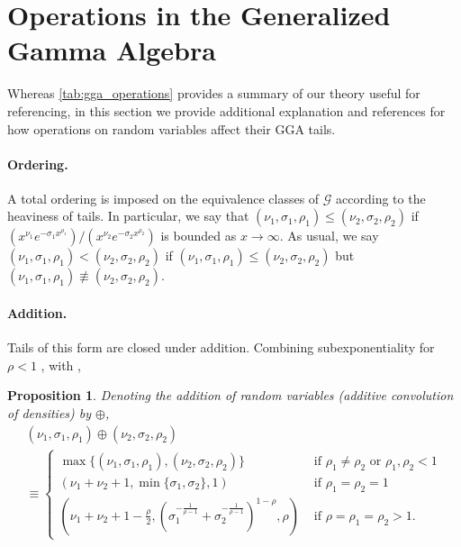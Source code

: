 \documentclass{article}
\newtheorem{proposition}{Proposition}
\theoremstyle{definition}
\begin{document}
\section{Operations in the Generalized Gamma Algebra}

Whereas \cref{tab:gga_operations} provides a summary of our theory useful
for referencing, in this section we provide additional explanation and references
for how operations on random variables affect their GGA tails.

\paragraph{Ordering.} A total ordering is imposed on the equivalence classes of $\mathcal{G}$ according to the heaviness of tails. In particular, we say that $(\nu_1,\sigma_1,\rho_1) \leq (\nu_2,\sigma_2,\rho_2)$ if $(x^{\nu_1} e^{-\sigma_1 x^{\rho_1}}) / (x^{\nu_2} e^{-\sigma_2 x^{\rho_2}})$ is bounded as $x \to \infty$. As usual, we say $(\nu_1,\sigma_1,\rho_1) < (\nu_2,\sigma_2,\rho_2)$ if $(\nu_1,\sigma_1,\rho_1) \leq (\nu_2,\sigma_2,\rho_2)$ but $(\nu_1,\sigma_1,\rho_1) \not\equiv (\nu_2,\sigma_2,\rho_2)$. 


\paragraph{Addition.} Tails of this form are  closed under addition. Combining subexponentiality for $\rho < 1$
\cite[Chapter X.1]{asmussen2010ruin}, 
with \cite[Thm 3.1 \& eqn. (8.3)]{asmussen2017tail},
\begin{proposition}
\label{prop:gga_add}
Denoting the addition of random variables (additive convolution of densities) by $\oplus$,
\begin{multline}
(\nu_{1},\sigma_{1},\rho_{1})\oplus(\nu_{2},\sigma_{2},\rho_{2})
\\\equiv \begin{cases}
\max\{(\nu_{1},\sigma_{1},\rho_{1}),(\nu_{2},\sigma_{2},\rho_{2})\} & \text{ if }\rho_{1}\neq\rho_{2}\text{ or }\rho_{1},\rho_{2}<1\\
\left(\nu_{1}+\nu_{2}+1,\min\{\sigma_{1},\sigma_{2}\},1\right) & \text{ if }\rho_{1}=\rho_{2}=1\\
(\nu_{1}+\nu_{2}+1-\frac{\rho}{2},(\sigma_{1}^{-\frac{1}{\rho-1}}+\sigma_{2}^{-\frac{1}{\rho-1}})^{1-\rho},\rho) & \text{ if }\rho=\rho_{1}=\rho_{2}>1.
\end{cases}
\end{multline}
\end{proposition}
\end{document}
